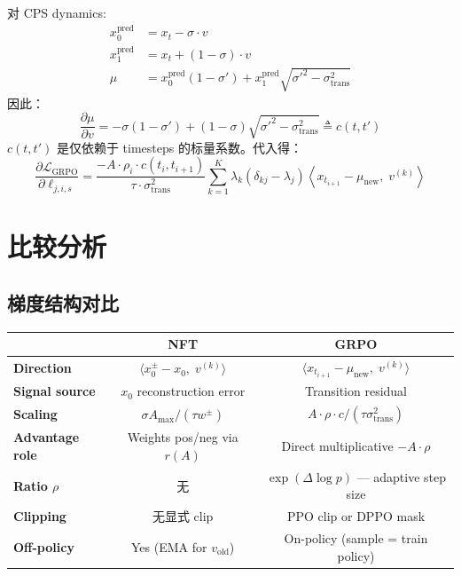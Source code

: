 \documentclass[11pt,a4paper]{article}
\newcommand{\loss}{\mathcal{L}}
\theoremstyle{definition}
\begin{document}
对 CPS dynamics:
\begin{align}
x_0^{\mathrm{pred}} &= x_t - \sigma \cdot v \\
x_1^{\mathrm{pred}} &= x_t + (1-\sigma) \cdot v \\
\mu &= x_0^{\mathrm{pred}}(1-\sigma') + x_1^{\mathrm{pred}}\sqrt{\sigma'^2 - \sigma_{\mathrm{trans}}^2}
\end{align}
因此：
\begin{equation}
\frac{\partial \mu}{\partial v} = -\sigma(1-\sigma') + (1-\sigma)\sqrt{\sigma'^2 - \sigma_{\mathrm{trans}}^2} \triangleq c(t, t')
\end{equation}
$c(t,t')$ 是仅依赖于 timesteps 的标量系数。代入得：
\begin{equation}
\frac{\partial \loss_{\mathrm{GRPO}}}{\partial \ell_{j,i,s}} = \frac{-A \cdot \rho_i \cdot c(t_i, t_{i+1})}{\tau \cdot \sigma_{\mathrm{trans}}^2} \sum_{k=1}^K \lambda_k(\delta_{kj} - \lambda_j) \left\langle x_{t_{i+1}} - \mu_{\mathrm{new}},\; v^{(k)}\right\rangle
\end{equation}

\section{比较分析}
\label{sec:comparison}

\subsection{梯度结构对比}

\begin{center}
\renewcommand{\arraystretch}{1.5}
\begin{tabular}{lcc}
\toprule
& \textbf{NFT} & \textbf{GRPO} \\
\midrule
\textbf{Direction} & $\langle x_0^{\pm} - x_0,\; v^{(k)}\rangle$ & $\langle x_{t_{i+1}} - \mu_{\mathrm{new}},\; v^{(k)}\rangle$ \\
\textbf{Signal source} & $x_0$ reconstruction error & Transition residual \\
\textbf{Scaling} & $\sigma A_{\max} / (\tau w^{\pm})$ & $A \cdot \rho \cdot c / (\tau \sigma_{\mathrm{trans}}^2)$ \\
\textbf{Advantage role} & Weights pos/neg via $r(A)$ & Direct multiplicative $-A \cdot \rho$ \\
\textbf{Ratio $\rho$} & 无 & $\exp(\Delta \log p)$ — adaptive step size \\
\textbf{Clipping} & 无显式 clip & PPO clip or DPPO mask \\
\textbf{Off-policy} & Yes (EMA for $v_{\mathrm{old}}$) & On-policy (sample = train policy) \\
\bottomrule
\end{tabular}
\end{center}
\end{document}
